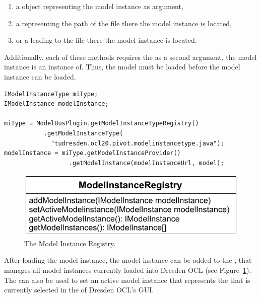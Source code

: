 \begin{enumerate}
	\item a  object representing the model instance as argument,
	\item a  representing the path of the file there the model
	  instance is located,
	\item or a  leading to the file there the model instance is located.
\end{enumerate}

Additionally, each of these methods requires the  as a second
argument, the model instance is an instance of. Thus, the model must be loaded 
before the model instance can be loaded.

\lstset{
  language=Java
}
\begin{lstlisting}[caption={How to load a model instance.}, captionpos=b, label=lst:integration:loadModelInstance, float]
IModelInstanceType miType;
IModelInstance modelInstance;

miType = ModelBusPlugin.getModelInstanceTypeRegistry()
           .getModelInstanceType(
             "tudresden.ocl20.pivot.modelinstancetype.java");
modelInstance = miType.getModelInstanceProvider()
                  .getModelInstance(modelInstanceUrl, model);
\end{lstlisting}

\begin{figure}[!b]
	\centering
	\includegraphics[width=.75\linewidth]{figures/integration/modelInstanceRegistry}
	\caption{The Model Instance Registry.}
	\label{pic:integration:modelInstanceRegistry}
\end{figure}

After loading the model instance, the model instance can be added to the
, that manages all model instances currently
loaded into Dresden OCL (see Figure~\ref{pic:integration:modelInstanceRegistry}).
The  can also be used to set an active model
instance that represents the  that is currently selected in
the  of Dresden OCL's GUI.



